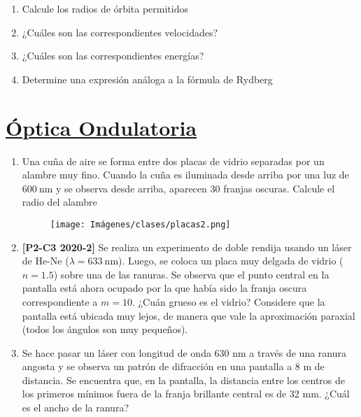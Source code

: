 \documentclass[letterpaper,11pt]{article}
\begin{document}
\begin{enumerate}
\begin{enumerate}
    \item Calcule los radios de órbita permitidos

    \item ¿Cuáles son las correspondientes velocidades?

    \item ¿Cuáles son las correspondientes energías?

    \item Determine una expresión análoga a la fórmula de Rydberg
\end{enumerate}
\end{enumerate}


\section*{\underline{Óptica Ondulatoria}}

\begin{enumerate}\setlength{\itemsep}{0.4cm}
\item Una cuña de aire se forma entre dos placas de vidrio separadas
por un alambre muy fino. Cuando la cuña es iluminada desde arriba por una luz de $\SI{600}{\nm}$ y se observa desde arriba, aparecen 30 franjas oscuras. Calcule el radio del alambre

\begin{figure}[H]
    \centering
    \texttt{[image: Imágenes/clases/placas2.png]}
\end{figure}

\item \textbf{[P2-C3 2020-2]} Se realiza un experimento de doble rendija usando un láser de He-Ne ($\lambda = \SI{633}{\nm}$). Luego, se coloca un placa muy delgada de vidrio ($n = 1.5$) sobre una de las ranuras. Se observa que el punto central en la pantalla está ahora ocupado por la que había sido la franja oscura correspondiente a $m = 10$. ¿Cuán grueso es el vidrio?
Considere que la pantalla está ubicada muy lejos, de manera que vale la aproximación paraxial (todos los ángulos son muy pequeños).


\item Se hace pasar un láser con longitud de onda 630 nm a través de una ranura angosta y se observa un patrón de difracción en una pantalla a 8 m de distancia. Se encuentra que, en la pantalla, la distancia entre los centros de los primeros mínimos fuera de la franja brillante central es de 32 mm. ¿Cuál es el ancho de la ranura?
\end{enumerate}
\end{document}
